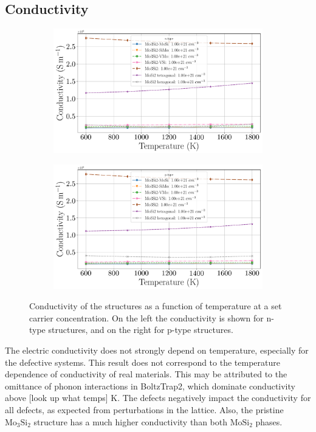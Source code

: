 \documentclass[12pt]{article}
\theoremstyle{plain}
\theoremstyle{definition}
\newcommand{\<}{\langle}
\renewcommand{\>}{\rangle}
\begin{document}
\subsection{Conductivity}

\begin{figure}[t!]
\centering
\begin{subfigure}{.5\textwidth}
  \centering
  \includegraphics[width=\linewidth]{allmats_C_temp_doping_n}
  \caption{}
  \label{fig:sub1}
\end{subfigure}%
\begin{subfigure}{.5\textwidth}
  \centering
  \includegraphics[width=\linewidth]{allmats_C_temp_doping_p}
  \caption{}
  \label{fig:sub2}
\end{subfigure}
\caption{Conductivity of the structures as a function of temperature at a set carrier concentration. On the left the conductivity is shown for n-type structures, and on the right for p-type structures.}
\label{fig:C-Temp}
\end{figure}

The electric conductivity does not strongly depend on temperature, especially for the defective systems. This result does not correspond to the temperature dependence of conductivity of real materials. This may be attributed to the omittance of phonon interactions in BoltzTrap2, which dominate conductivity above [look up what temps] K. The defects negatively impact the conductivity for all defects, as expected from perturbations in the lattice. Also, the pristine $\text{Mo}_3\text{Si}_2$ structure has a much higher conductivity than both $\text{Mo}\text{Si}_2$ phases. 
\end{document}
